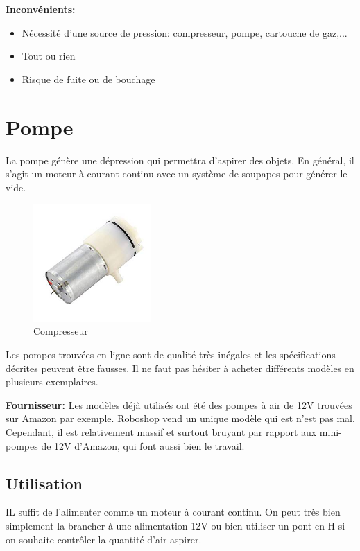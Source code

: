 \documentclass[a4paper, 11pt]{report}
\begin{document}
\textbf{Inconvénients:}
\begin{itemize}
\item Nécessité d'une source de pression: compresseur, pompe, cartouche de gaz,...
\item Tout ou rien
\item Risque de fuite ou de bouchage
\end{itemize}

\section{Pompe}
La pompe génère une dépression qui permettra d'aspirer des objets. En général, il s'agit un moteur à courant continu avec un système de soupapes pour générer le vide.

\begin{figure}
\begin{centering}
\includegraphics[width=0.4\textwidth]{images/pompeAvide.jpeg}
\caption{Compresseur}
\par\end{centering}
\end{figure}

Les pompes trouvées en ligne sont de qualité très inégales et les spécifications décrites peuvent être fausses. Il ne faut pas hésiter à acheter différents modèles en plusieurs exemplaires. 

\textbf{Fournisseur:}
Les modèles déjà utilisés ont été des pompes à air de 12V trouvées sur Amazon par exemple. Roboshop vend un unique modèle qui est n'est pas mal. Cependant, il est relativement massif et surtout bruyant par rapport aux mini-pompes de 12V d'Amazon, qui font aussi bien le travail.

\subsection{Utilisation}
IL suffit de l'alimenter comme un moteur à courant continu. On peut très bien simplement la brancher à une alimentation 12V ou bien utiliser un pont en H si on souhaite contrôler la quantité d'air aspirer. 
\end{document}
